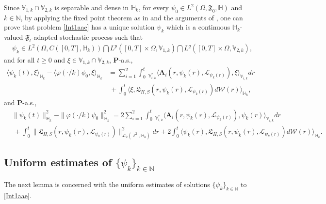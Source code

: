 \documentclass[11pt]{article}
\renewcommand{\geq}{\geqslant}  %
\numberwithin{equation}{section}
\begin{document}
Since $\mathbb{V}_{1,k}\cap \mathbb{V}_{2,k}$ is
separable and dense
in $\mathbb{H}_k$, for every $\psi_0\in L^2(\Omega,\mathfrak{F}_0,\mathbb{H})$ and $k\in\mathbb{N}$,
by applying the fixed point theorem
 as in \cite{Chenzhang4b}
 and  the arguments of
  \cite{BWangsubmitted,Wangjde},
   one can prove that  problem \eqref{Int1aae} has a unique solution $\psi_k$ which is a continuous $\mathbb{H}_k$-valued
$\mathfrak{F}_t$-adapted stochastic process such that
\begin{align}\label{eihkhnergy5new}
&\psi_k
 \in L^2(\Omega, C([0,T], \mathbb{H}_k ))\bigcap L^p([0,T]\times\Omega, \mathbb{V}_{1,k}  )\bigcap L^q([0,T]\times\Omega, \mathbb{V}_{2,k}),
\end{align}
and for all $t\geq0$ and $\xi\in \mathbb{V}_{1,k}\cap \mathbb{V}_{2,k}$, $\mathbf{P}$-a.s.,
\begin{align}
\label{Defsolution1jff}
\langle \psi_k(t) ,\xi\rangle_{\mathbb{H}_{k}}-\langle
  \varphi(\cdot/k)\phi_0 ,\xi\rangle_{\mathbb{H}_{k}}
&=
\sum_{i=1}^2\int_{0}^t \ _{\mathbb{V}_{i,k}^*}\big\langle \mathbf{A}_i(r,\psi_k(r),\mathcal{L}_{
\psi_k(r)}),
\xi\big  \rangle_{\mathbb{V}_{i,k}}
 dr
\nonumber\\&\ +\int_{0}^t
 \big\langle \xi, \mathfrak{L}_{H,S}(r,\psi_k(r),\mathcal{L}_{
\psi_k(r)})d\mathcal{W}(r) \big\rangle_{\mathbb{H}_{k}},
\end{align}
and $\mathbf{P}$-a.s.,
\begin{align}\label{energy5new}
& \|\psi_k(t)\|_{\mathbb{H}_{k}}^2-\|
  \varphi(\cdot/k)\psi_0\|_{\mathbb{H}_{k}}^2
  =2\sum_{i=1}^2\int_{0}^t \ _{\mathbb{V}_{i,k}^*}\big\langle \mathbf{A}_i(r,\psi_k(r),\mathcal{L}_{
\psi_k(r)}),
\psi_k(r)\big  \rangle_{\mathbb{V}_{i,k}}
 dr
\nonumber\\&  \  +\int_{0}^t\|\mathfrak{L}_{H,S}(r,
\psi_k(r),\mathcal{L}_{
\psi_k(r)})\|^2_{\mathcal{L}_2(\ell^2,
\mathbb{H}_{k})}dr
  +2\int_{0}^t
 \big\langle \psi_k(r), \mathfrak{L}_{H,S}(r,\psi_k(r),\mathcal{L}_{
\psi_k(r)})d\mathcal{W}(r) \big\rangle_{\mathbb{H}_{k}}.
\end{align}



\subsection{Uniform estimates of $\{\psi_k\}_{k\in\mathbb{N}}$}
The next lemma is concerned with the uniform estimates  of solutions $\{\psi_k\}_{k\in\mathbb{N}}$ to \eqref{Int1aae}.
\end{document}
